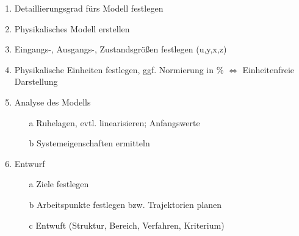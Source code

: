 \begin{enumerate}
    \item Detaillierungsgrad fürs Modell festlegen
    \item Physikalisches Modell erstellen
    \item Eingangs-, Ausgangs-, Zustandsgrößen festlegen (u,y,x,z)
    \item Physikalische Einheiten festlegen, ggf. Normierung in \% $\Longleftrightarrow$ Einheitenfreie Darstellung
    \item Analyse des Modells
    \begin{itemize}
        \item [a] Ruhelagen, evtl. linearisieren; Anfangswerte
        \item [b] Systemeigenschaften ermitteln
    \end{itemize}
    \item Entwurf
    \begin{itemize}
        \item [a] Ziele festlegen
        \item [b] Arbeitspunkte festlegen bzw. Trajektorien planen
        \item [c] Entwuft (Struktur, Bereich, Verfahren, Kriterium)
        \end{itemize}
\end{enumerate}